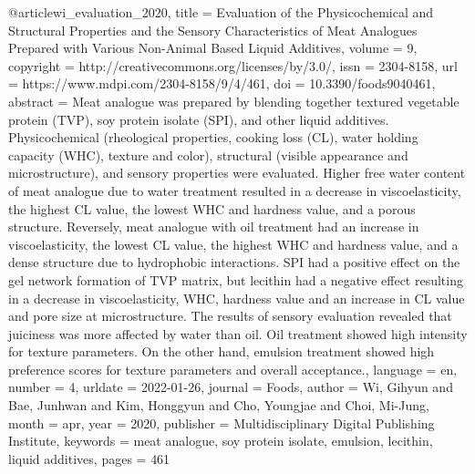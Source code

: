 
@article{wi_evaluation_2020,
	title = {Evaluation of the {Physicochemical} and {Structural} {Properties} and the {Sensory} {Characteristics} of {Meat} {Analogues} {Prepared} with {Various} {Non}-{Animal} {Based} {Liquid} {Additives}},
	volume = {9},
	copyright = {http://creativecommons.org/licenses/by/3.0/},
	issn = {2304-8158},
	url = {https://www.mdpi.com/2304-8158/9/4/461},
	doi = {10.3390/foods9040461},
	abstract = {Meat analogue was prepared by blending together textured vegetable protein (TVP), soy protein isolate (SPI), and other liquid additives. Physicochemical (rheological properties, cooking loss (CL), water holding capacity (WHC), texture and color), structural (visible appearance and microstructure), and sensory properties were evaluated. Higher free water content of meat analogue due to water treatment resulted in a decrease in viscoelasticity, the highest CL value, the lowest WHC and hardness value, and a porous structure. Reversely, meat analogue with oil treatment had an increase in viscoelasticity, the lowest CL value, the highest WHC and hardness value, and a dense structure due to hydrophobic interactions. SPI had a positive effect on the gel network formation of TVP matrix, but lecithin had a negative effect resulting in a decrease in viscoelasticity, WHC, hardness value and an increase in CL value and pore size at microstructure. The results of sensory evaluation revealed that juiciness was more affected by water than oil. Oil treatment showed high intensity for texture parameters. On the other hand, emulsion treatment showed high preference scores for texture parameters and overall acceptance.},
	language = {en},
	number = {4},
	urldate = {2022-01-26},
	journal = {Foods},
	author = {Wi, Gihyun and Bae, Junhwan and Kim, Honggyun and Cho, Youngjae and Choi, Mi-Jung},
	month = apr,
	year = {2020},
	publisher = {Multidisciplinary Digital Publishing Institute},
	keywords = {meat analogue, soy protein isolate, emulsion, lecithin, liquid additives},
	pages = {461}
}

